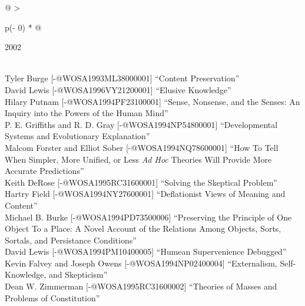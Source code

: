 \documentclass[
  10pt,
  letterpaper,
  DIV=11,
  numbers=noendperiod,
  twoside]{scrartcl}
\begin{document}
\begin{longtable}[]{@{}
  >{\raggedright\arraybackslash}p{(\columnwidth - 0\tabcolsep) * }@{}}

\caption{\label{tbl-top-ten-1993}Most cited articles published less than
ten years ago as of 2002.}

\tabularnewline

\toprule\noalign{}
\begin{minipage}[b]{\linewidth}\raggedright
2002
\end{minipage} \\
\midrule\noalign{}
\endhead
\bottomrule\noalign{}
\endlastfoot
Tyler Burge {[}-@WOSA1993ML38000001{]} ``Content Preservation'' \\
David Lewis {[}-@WOSA1996VY21200001{]} ``Elusive Knowledge'' \\
Hilary Putnam {[}-@WOSA1994PF23100001{]} ``Sense, Nonsense, and the
Senses: An Inquiry into the Powers of the Human Mind'' \\
P. E. Griffiths and R. D. Gray {[}-@WOSA1994NP54800001{]}
``Developmental Systems and Evolutionary Explanation'' \\
Malcom Forster and Elliot Sober {[}-@WOSA1994NQ78600001{]} ``How To Tell
When Simpler, More Unified, or Less \emph{Ad Hoc} Theories Will Provide
More Accurate Predictions'' \\
Keith DeRose {[}-@WOSA1995RC31600001{]} ``Solving the Skeptical
Problem'' \\
Hartry Field {[}-@WOSA1994NY27600001{]} ``Deflationist Views of Meaning
and Content'' \\
Michael B. Burke {[}-@WOSA1994PD73500006{]} ``Preserving the Principle
of One Object To a Place: A Novel Account of the Relations Among
Objects, Sorts, Sortals, and Persistance Conditions'' \\
David Lewis {[}-@WOSA1994PM10400005{]} ``Humean Supervenience
Debugged'' \\
Kevin Falvey and Joseph Owens {[}-@WOSA1994NP02400004{]} ``Externalism,
Self-Knowledge, and Skepticism'' \\
Dean W. Zimmerman {[}-@WOSA1995RC31600002{]} ``Theories of Masses and
Problems of Constitution'' \\

\end{longtable}
\end{document}
